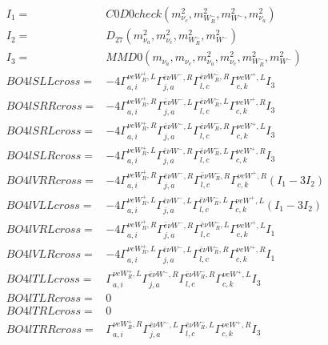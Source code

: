 \documentclass[A4,landscape]{article}
\begin{document}
\begin{align} 
I_1 = & C0D0check(m^2_{\nu_{{c}}}, m^2_{W_R^-}, m^2_{W^-}, m^2_{\nu_{{a}}}) \\ 
I_2 = & D_{27}(m^2_{\nu_{{a}}}, m^2_{\nu_{{c}}}, m^2_{W_R^-}, m^2_{W^-}) \\ 
I_3 = & MMD0(m_{\nu_{{a}}}, m_{\nu_{{c}}}, m^2_{\nu_{{a}}}, m^2_{\nu_{{c}}}, m^2_{W_R^-}, m^2_{W^-}) \\ 
  BO4lSLLcross= & -4  \Gamma^{\nu e W_R^+,L}_{a, i} \Gamma^{\bar{e}\nu W^- ,R}_{j, a} \Gamma^{\bar{e}\nu W_R^- ,R}_{l, c} \Gamma^{\nu e W^+,L}_{c, k} I_3 \\ 
  BO4lSRRcross= & -4  \Gamma^{\nu e W_R^+,R}_{a, i} \Gamma^{\bar{e}\nu W^- ,L}_{j, a} \Gamma^{\bar{e}\nu W_R^- ,L}_{l, c} \Gamma^{\nu e W^+,R}_{c, k} I_3 \\ 
  BO4lSRLcross= & -4  \Gamma^{\nu e W_R^+,R}_{a, i} \Gamma^{\bar{e}\nu W^- ,L}_{j, a} \Gamma^{\bar{e}\nu W_R^- ,R}_{l, c} \Gamma^{\nu e W^+,L}_{c, k} I_3 \\ 
  BO4lSLRcross= & -4  \Gamma^{\nu e W_R^+,L}_{a, i} \Gamma^{\bar{e}\nu W^- ,R}_{j, a} \Gamma^{\bar{e}\nu W_R^- ,L}_{l, c} \Gamma^{\nu e W^+,R}_{c, k} I_3 \\ 
  BO4lVRRcross= & -4  \Gamma^{\nu e W_R^+,R}_{a, i} \Gamma^{\bar{e}\nu W^- ,R}_{j, a} \Gamma^{\bar{e}\nu W_R^- ,R}_{l, c} \Gamma^{\nu e W^+,R}_{c, k} (I_1 - 3 I_2) \\ 
  BO4lVLLcross= & -4  \Gamma^{\nu e W_R^+,L}_{a, i} \Gamma^{\bar{e}\nu W^- ,L}_{j, a} \Gamma^{\bar{e}\nu W_R^- ,L}_{l, c} \Gamma^{\nu e W^+,L}_{c, k} (I_1 - 3 I_2) \\ 
  BO4lVRLcross= & -4  \Gamma^{\nu e W_R^+,R}_{a, i} \Gamma^{\bar{e}\nu W^- ,R}_{j, a} \Gamma^{\bar{e}\nu W_R^- ,L}_{l, c} \Gamma^{\nu e W^+,L}_{c, k} I_1 \\ 
  BO4lVLRcross= & -4  \Gamma^{\nu e W_R^+,L}_{a, i} \Gamma^{\bar{e}\nu W^- ,L}_{j, a} \Gamma^{\bar{e}\nu W_R^- ,R}_{l, c} \Gamma^{\nu e W^+,R}_{c, k} I_1 \\ 
  BO4lTLLcross= &  \Gamma^{\nu e W_R^+,L}_{a, i} \Gamma^{\bar{e}\nu W^- ,R}_{j, a} \Gamma^{\bar{e}\nu W_R^- ,R}_{l, c} \Gamma^{\nu e W^+,L}_{c, k} I_3 \\ 
  BO4lTLRcross= & 0 \\ 
  BO4lTRLcross= & 0 \\ 
  BO4lTRRcross= &  \Gamma^{\nu e W_R^+,R}_{a, i} \Gamma^{\bar{e}\nu W^- ,L}_{j, a} \Gamma^{\bar{e}\nu W_R^- ,L}_{l, c} \Gamma^{\nu e W^+,R}_{c, k} I_3 \\ 
\end{align} 
\end{document}
